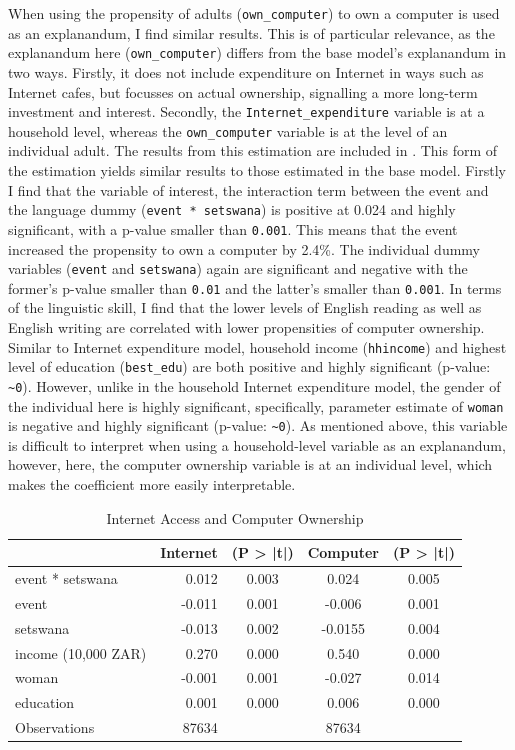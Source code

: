 \documentclass[a4paper,british]{article}\usepackage[]{graphicx}\usepackage[]{color}
\providecommand{\tabularnewline}{\\}
\providecommand*{\code}[1]{\texttt{#1}}
\begin{document}
When using the propensity of adults (\code{own\_computer}) to own
a computer is used as an explanandum, I find similar results. This
is of particular relevance, as the explanandum here (\code{own\_computer})
differs from the base model's explanandum in two ways. Firstly, it
does not include expenditure on Internet in ways such as Internet
cafes, but focusses on actual ownership, signalling a more long-term
investment and interest. Secondly, the \code{Internet\_expenditure}
variable is at a household level, whereas the \code{own\_computer}
variable is at the level of an individual adult. The results from
this estimation are included in . This form of
the estimation yields similar results to those estimated in the base
model. Firstly I find that the variable of interest, the interaction
term between the event and the language dummy (\code{event {*} setswana})
is positive at 0.024 and highly significant, with a p-value smaller
than \code{0.001}. This means that the event increased the propensity
to own a computer by 2.4\%. The individual dummy variables (\code{event}
and \code{setswana}) again are significant and negative with the
former's p-value smaller than \code{0.01} and the latter's smaller
than \code{0.001}. In terms of the linguistic skill, I find that
the lower levels of English reading as well as English writing are
correlated with lower propensities of computer ownership. Similar
to Internet expenditure model, household income (\code{hhincome})
and highest level of education (\code{best\_edu}) are both positive
and highly significant (p-value: \code{\textasciitilde 0}). However,
unlike in the household Internet expenditure model, the gender of
the individual here is highly significant, specifically, parameter
estimate of \code{woman} is negative and highly significant (p-value:
\code{\textasciitilde 0}). As mentioned above, this variable is difficult
to interpret when using a household-level variable as an explanandum,
however, here, the computer ownership variable is at an individual
level, which makes the coefficient more easily interpretable.

\begin{table}

\caption{Internet Access and Computer Ownership}

\begin{centering}
\label{tab:esti-full}
\par\end{centering}
\centering{}%
\begin{tabular}{|l|r|c|c|c|}
\hline 
 &
Internet &
(P > |t|) &
Computer &
(P > |t|)\tabularnewline
\hline 
\hline 
event {*} setswana &
0.012 &
0.003 &
0.024 &
0.005\tabularnewline
\hline 
event &
-0.011 &
0.001 &
-0.006 &
0.001\tabularnewline
\hline 
setswana &
-0.013 &
0.002 &
-0.0155 &
0.004\tabularnewline
\hline 
income (10,000 ZAR) &
0.270 &
0.000 &
0.540 &
0.000\tabularnewline
\hline 
woman &
-0.001 &
0.001 &
-0.027 &
0.014\tabularnewline
\hline 
education &
0.001 &
0.000 &
0.006 &
0.000\tabularnewline
\hline 
Observations &
87634 &
 &
87634 &
\tabularnewline
\hline 
\end{tabular}
\end{table}
\end{document}
